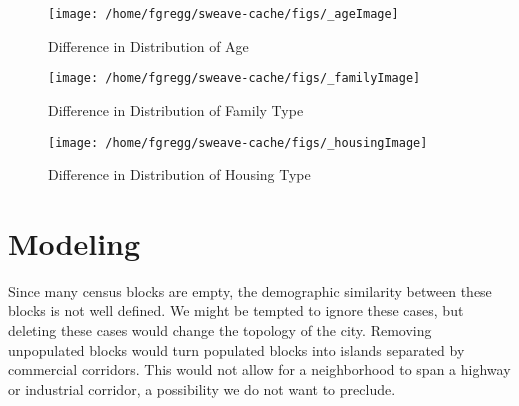 \documentclass[12pt,letter]{article}\usepackage[]{graphicx}\usepackage[]{color}
\makeatletter
\def\maxwidth{ %
  \ifdim\Gin@nat@width>\linewidth
    \linewidth
  \else
    \Gin@nat@width
  \fi
}
\newenvironment{knitrout}{}{} %
\makeatother
\begin{document}
\begin{figure}
\begin{knitrout}
\color{fgcolor}

{\centering \texttt{[image: /home/fgregg/sweave-cache/figs/\_ageImage]} 

}



\end{knitrout}

\caption{Difference in Distribution of Age}
\end{figure}


\begin{figure}
\begin{knitrout}
\color{fgcolor}

{\centering \texttt{[image: /home/fgregg/sweave-cache/figs/\_familyImage]} 

}



\end{knitrout}

\caption{Difference in Distribution of Family Type}
\end{figure}


\begin{figure}
\begin{knitrout}
\color{fgcolor}

{\centering \texttt{[image: /home/fgregg/sweave-cache/figs/\_housingImage]} 

}



\end{knitrout}

\caption{Difference in Distribution of Housing Type}
\end{figure}

\section*{Modeling}
Since many census blocks are empty, the demographic similarity between
these blocks is not well defined. We might be tempted to ignore these
cases, but deleting these cases would change the topology of the
city. Removing unpopulated blocks would turn populated blocks into
islands separated by commercial corridors. This would not allow for a
neighborhood to span a highway or industrial corridor, a possibility
we do not want to preclude.
\end{document}

